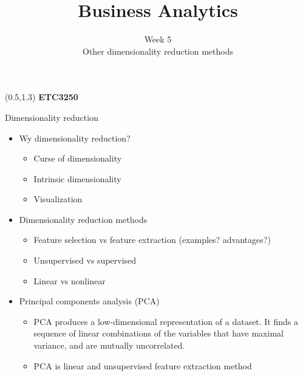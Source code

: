 \documentclass[14pt]{beamer}
\title[5. Other dimensionality reduction methods]{Business Analytics}
\author{Week 5\\ Other dimensionality reduction methods}
\begin{document}
\begin{frame}[plain]{}
\maketitle
\begin{textblock}{11}(0.5,1.3){\color{white}\large
\textbf{ETC3250}}
\end{textblock}
\end{frame}


\begin{frame}{Dimensionality reduction}\large

\begin{itemize}
\item Wy dimensionality reduction?
\begin{itemize}
	\item Curse of dimensionality
	\item Intrinsic dimensionality
	\item Visualization
\end{itemize}

\item Dimensionality reduction methods
\begin{itemize}
\item Feature selection vs feature extraction (examples? advantages?)
\item Unsupervised vs supervised
\item Linear vs nonlinear
\end{itemize}

\item Principal components analysis (PCA)
\begin{itemize}
\item PCA produces a low-dimensional representation of a dataset. It finds a sequence of linear combinations of the variables that have maximal variance, and are mutually uncorrelated.
\item PCA is linear and unsupervised feature extraction method
\end{itemize}

\end{itemize}


\end{frame}
\end{document}
